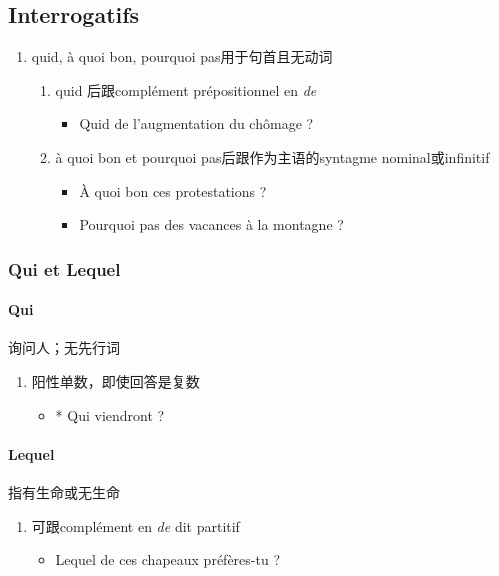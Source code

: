 \documentclass[UTF8]{report}
\begin{document}
\subsection{Interrogatifs}
\begin{enumerate}
    \item quid, à quoi bon, pourquoi pas用于句首且无动词
    \begin{enumerate}
        \item quid 后跟complément prépositionnel en \textit{de}
        \begin{itemize}
            \item Quid de l’augmentation du chômage ?
        \end{itemize}
        \item à quoi bon et pourquoi pas后跟作为主语的syntagme nominal或infinitif
        \begin{itemize}
            \item À quoi bon ces protestations ?
            \item Pourquoi pas des vacances à la montagne ?
        \end{itemize}
    \end{enumerate}
\end{enumerate}

\subsubsection{Qui et Lequel}
\paragraph{Qui}
询问人；无先行词
\begin{enumerate}
    \item 阳性单数，即使回答是复数
    \begin{itemize}
        \item * Qui viendront ?
    \end{itemize}
\end{enumerate}
\paragraph{Lequel}
指有生命或无生命
\begin{enumerate}
    \item 可跟complément en \textit{de} dit partitif
    \begin{itemize}
        \item Lequel de ces chapeaux préfères-tu ?
    \end{itemize}
\end{enumerate}
\end{document}
